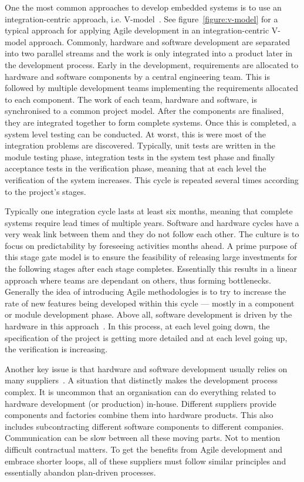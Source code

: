 \documentclass[english]{tktltiki2}
\begin{document}
One the most common approaches to develop embedded systems is to use an integration-centric approach, i.e. V-model~\cite{EB12, EHS14}. See figure~\ref{figure:v-model} for a typical approach for applying Agile development in an integration-centric V-model approach. Commonly, hardware and software development are separated into two parallel streams and the work is only integrated into a product later in the development process. Early in the development, requirements are allocated to hardware and software components by a central engineering team. This is followed by multiple development teams implementing the requirements allocated to each component. The work of each team, hardware and software, is synchronised to a common project model. After the components are finalised, they are integrated together to form complete systems. Once this is completed, a system level testing can be conducted. At worst, this is were most of the integration problems are discovered. Typically, unit tests are written in the module testing phase, integration tests in the system test phase and finally acceptance tests in the verification phase, meaning that at each level the verification of the system increases. This cycle is repeated several times according to the project’s stages.

Typically one integration cycle lasts at least six months, meaning that complete systems require lead times of multiple years. Software and hardware cycles have a very weak link between them and they do not follow each other. The culture is to focus on predictability by foreseeing activities months ahead. A prime purpose of this stage gate model is to ensure the feasibility of releasing large investments for the following stages after each stage completes. Essentially this results in a linear approach where teams are dependant on others, thus forming bottlenecks. Generally the idea of introducing Agile methodologies is to try to increase the rate of new features being developed within this cycle — mostly in a component or module development phase. Above all, software development is driven by the hardware in this approach~\cite{EB12}. In this process, at each level going down, the specification of the project is getting more detailed and at each level going up, the verification is increasing.

Another key issue is that hardware and software development usually relies on many suppliers~\cite{EB12, HAB12, EHS14}. A situation that distinctly makes the development process complex. It is uncommon that an organisation can do everything related to hardware development (or production) in-house. Different suppliers provide components and factories combine them into hardware products. This also includes subcontracting different software components to different companies. Communication can be slow between all these moving parts. Not to mention difficult contractual matters. To get the benefits from Agile development and embrace shorter loops, all of these suppliers must follow similar principles and essentially abandon plan-driven processes.
\end{document}

